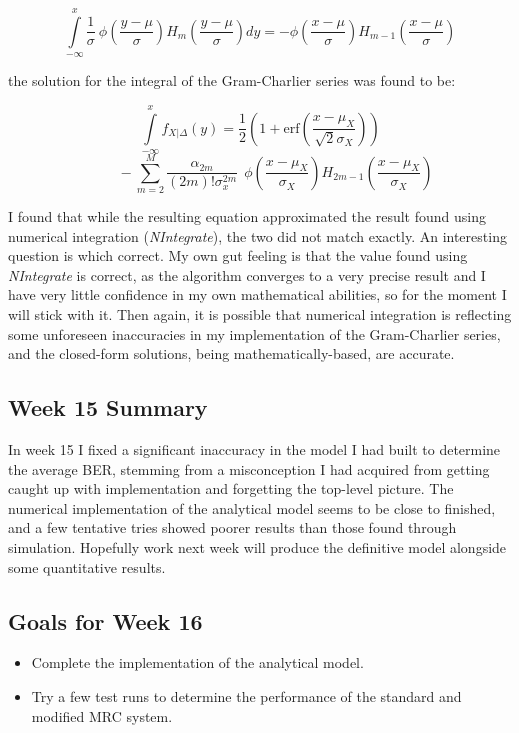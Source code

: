 \[
\int \limits_{-\infty}^x \frac{1}{\sigma} \: \phi \! \left ( \frac{y-\mu}{\sigma} \right ) H_m \! \left ( \frac{y-\mu}{\sigma} \right ) dy =
- \phi \! \left ( \frac{x-\mu}{\sigma} \right ) H_{m-1} \! \left ( \frac{x-\mu}{\sigma} \right )
\]

the solution for the integral of the Gram-Charlier series was found to
be:

\[
\int \limits_{- \infty}^x f_{X\vert \Delta}(y) = \frac{1}{2} \left ( 1 + \text{erf} \! \left ( \frac{x-\mu_X}{\sqrt{2} \sigma_X} \right ) \right )
\]
\[
\; \; \; \; \; \; \; \;  - \sum \limits_{m=2}^M \frac{\alpha_{2m}}{(2m)! \sigma_x^{2m}} \: \: \phi \! \left ( \frac{x-\mu_X}{\sigma_X} \right ) H_{2m-1} \! \left ( \frac{x-\mu_X}{\sigma_X} \right )
\]

I found that while the resulting equation approximated the result found
using numerical integration (\emph{NIntegrate}), the two did not match
exactly. An interesting question is which correct. My own gut feeling is
that the value found using \emph{NIntegrate} is correct, as the
algorithm converges to a very precise result and I have very little
confidence in my own mathematical abilities, so for the moment I will
stick with it. Then again, it is possible that numerical integration is
reflecting some unforeseen inaccuracies in my implementation of the
Gram-Charlier series, and the closed-form solutions, being
mathematically-based, are accurate.

\subsection{Week 15 Summary}

In week 15 I fixed a significant inaccuracy in the model I had built to
determine the average BER, stemming from a misconception I had acquired
from getting caught up with implementation and forgetting the top-level
picture. The numerical implementation of the analytical model seems to
be close to finished, and a few tentative tries showed poorer results
than those found through simulation. Hopefully work next week will
produce the definitive model alongside some quantitative results.

\subsection{Goals for Week 16}

\begin{itemize}
\itemsep1pt\parskip0pt
\item
  Complete the implementation of the analytical model.
\item
  Try a few test runs to determine the performance of the standard and
  modified MRC system.
\end{itemize}

